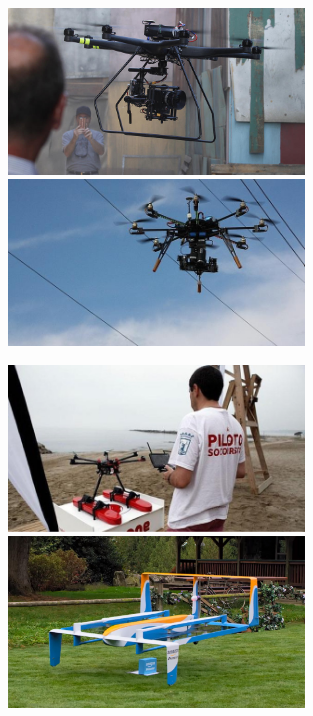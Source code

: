 \documentclass[notes,slidesec,a4]{seminar}
\begin{document}
\begin{hslide}
\begin{minipage}[t]{0.5\textwidth}
\begin{center}
\begin{figure}
\includegraphics[width=0.7\textwidth]{img/dronefilm}
\includegraphics[width=0.7\textwidth]{img/dronendesa}
\end{figure}
\end{center}
\end{minipage}
\begin{minipage}[t]{0.5\textwidth}
\begin{center}
\begin{figure}
\includegraphics[width=0.7\textwidth]{img/socorrista}
\includegraphics[width=0.7\textwidth]{img/amazon}
\end{figure}
\end{center}
\end{minipage}
\end{hslide}
\end{document}
